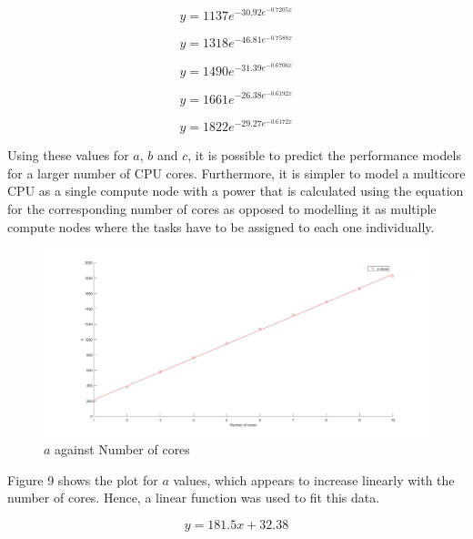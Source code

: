 \documentclass[a4paper,11pt]{article}
\begin{document}
\begin{equation}
y = 1137e^{-30.92e^{-0.7205x}}
\end{equation}

\begin{equation}
y = 1318e^{-46.81e^{-0.7588x}}
\end{equation}

\begin{equation}
y = 1490e^{-31.39e^{-0.6706x}}
\end{equation}

\begin{equation}
y = 1661e^{-26.38e^{-0.6192x}}
\end{equation}

\begin{equation}
y = 1822e^{-29.27e^{-0.6172x}}
\end{equation}

\noindent Using these values for $a$, $b$ and $c$, it is possible to predict the performance models for a larger number of CPU cores. Furthermore, it is simpler to model a multicore CPU as a single compute node with a power that is calculated using the equation for the corresponding number of cores as opposed to modelling it as multiple compute nodes where the tasks have to be assigned to each one individually.

\begin{figure}[H]
	\hspace{-2.8cm}
	\includegraphics[scale=0.3]{images/multicore_a}
	\caption{$a$ against Number of cores}
\end{figure}

\noindent Figure 9 shows the plot for $a$ values, which appears to increase linearly with the number of cores. Hence, a linear function was used to fit this data.

\begin{equation}
y = 181.5x + 32.38
\end{equation}
\end{document}
